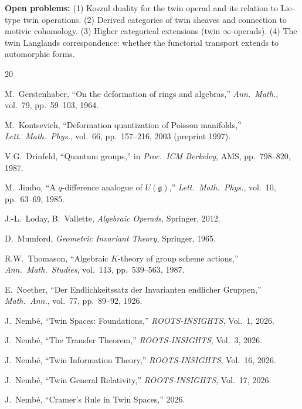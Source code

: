 \documentclass[11pt,twocolumn]{article}
\theoremstyle{plain}\newtheorem{theorem}{Theorem}\newtheorem{proposition}[theorem]{Proposition}\newtheorem{corollary}[theorem]{Corollary}\newtheorem{lemma}[theorem]{Lemma}
\theoremstyle{definition}\newtheorem{definition}[theorem]{Definition}\newtheorem{example}[theorem]{Example}
\theoremstyle{remark}\newtheorem{remark}[theorem]{Remark}
\begin{document}
\textbf{Open problems:} (1) Koszul duality for the twin operad and its relation to Lie-type twin operations. (2) Derived categories of twin sheaves and connection to motivic cohomology. (3) Higher categorical extensions (twin $\infty$-operads). (4) The twin Langlands correspondence: whether the functorial transport extends to automorphic forms.


\begin{thebibliography}{20}

 M.~Gerstenhaber, ``On the deformation of rings and algebras,'' \emph{Ann.\ Math.}, vol.~79, pp.~59--103, 1964.

 M.~Kontsevich, ``Deformation quantization of Poisson manifolds,'' \emph{Lett.\ Math.\ Phys.}, vol.~66, pp.~157--216, 2003 (preprint 1997).

 V.G.~Drinfeld, ``Quantum groups,'' in \emph{Proc.\ ICM Berkeley}, AMS, pp.~798--820, 1987.

 M.~Jimbo, ``A $q$-difference analogue of $U(\mathfrak{g})$,'' \emph{Lett.\ Math.\ Phys.}, vol.~10, pp.~63--69, 1985.

 J.-L.~Loday, B.~Vallette, \emph{Algebraic Operads}, Springer, 2012.

 D.~Mumford, \emph{Geometric Invariant Theory}, Springer, 1965.

 R.W.~Thomason, ``Algebraic $K$-theory of group scheme actions,'' \emph{Ann.\ Math.\ Studies}, vol.~113, pp.~539--563, 1987.

 E.~Noether, ``Der Endlichkeitssatz der Invarianten endlicher Gruppen,'' \emph{Math.\ Ann.}, vol.~77, pp.~89--92, 1926.

 J.~Nemb\'e, ``Twin Spaces: Foundations,'' \emph{ROOTS-INSIGHTS}, Vol.~1, 2026.

 J.~Nemb\'e, ``The Transfer Theorem,'' \emph{ROOTS-INSIGHTS}, Vol.~3, 2026.

 J.~Nemb\'e, ``Twin Information Theory,'' \emph{ROOTS-INSIGHTS}, Vol.~16, 2026.

 J.~Nemb\'e, ``Twin General Relativity,'' \emph{ROOTS-INSIGHTS}, Vol.~17, 2026.

 J.~Nemb\'e, ``Cramer's Rule in Twin Spaces,'' 2026.

\end{thebibliography}
\end{document}
